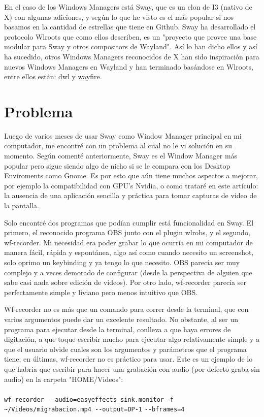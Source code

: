 \documentclass[conference]{IEEEtran}
\begin{document}
En el caso de los Windows Managers está Sway, que es un clon de I3 (nativo de X) con algunas adiciones, y según lo que he visto es el más popular si nos basamos en la cantidad de estrellas que tiene en Github. Sway ha desarrollado el protocolo Wlroots que como ellos describen, es un "proyecto que provee una base modular para Sway y otros compositors de Wayland"\cite{b5}. Así lo han dicho ellos y así ha sucedido, otros Windows Managers reconocidos de X han sido inspiración para nuevos Windows Managers en
Wayland y han terminado basándose en Wlroots, entre ellos están: dwl y 
wayfire\cite{b6}.

\section{Problema}

Luego de varios meses de usar Sway como Window Manager principal en mi computador, me encontré con un problema al cual no le vi solución en su momento. Según comenté anteriormente, Sway es el Window Manager más popular pero sigue siendo algo de nicho si se le compara con los Desktop Enviroments como Gnome\cite{b7}. Es por esto que aún tiene muchos aspectos a mejorar, por ejemplo la compatibilidad con GPU's Nvidia, o como trataré en este artículo: la ausencia de una aplicación sencilla y práctica para
tomar capturas de video de la pantalla.

Solo encontré dos programas que podían cumplir está funcionalidad en Sway. El primero, el reconocido programa OBS junto con el plugin wlrobs, y el segundo, wf-recorder\cite{b8}. Mi necesidad era poder grabar lo que ocurría en mi computador de manera fácil, rápida y espontánea, algo así como cuando necesito un screenshot, solo oprimo un keybinding y ya tengo lo que necesito. OBS parecía ser muy complejo y a veces demorado de configurar (desde la perspectiva de alguien que sabe casi nada sobre edición de
videos). Por otro lado, wf-recorder parecía ser perfectamente simple y liviano pero menos intuitivo que OBS. 

Wf-recorder no es más que un comando para correr desde la terminal, que con varios argumentos puede dar un excelente resultado. No obstante, al ser un programa para ejecutar desde la terminal, conlleva a que haya errores de digitación, a que toque escribir mucho para ejecutar algo relativamente simple y a que el usuario olvide cuales son los argumentos y parámetros que el programa tiene;
en últimas, wf-recorder no es práctico para usar. Este es un ejemplo de lo que habría que escribir para hacer una grabación con audio (por defecto graba sin audio) en la carpeta "HOME/Videos":\\ \\
\verb|wf-recorder --audio=easyeffects_sink.monitor|   
\verb|-f ~/Videos/migrabacion.mp4 --output=DP-1|
\verb|--bframes=4| \\
\end{document}
